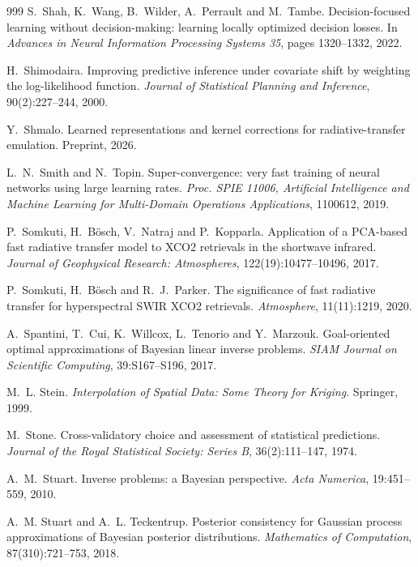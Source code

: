 \begin{thebibliography}{999}
S.~Shah, K.~Wang, B.~Wilder, A.~Perrault and M.~Tambe.
\newblock Decision-focused learning without decision-making: learning locally optimized decision losses.
\newblock In \emph{Advances in Neural Information Processing Systems 35}, pages 1320--1332, 2022.

H.~Shimodaira.
\newblock Improving predictive inference under covariate shift by weighting the log-likelihood function.
\newblock \emph{Journal of Statistical Planning and Inference}, 90(2):227--244, 2000.

Y.~Shmalo.
\newblock Learned representations and kernel corrections for radiative-transfer emulation.
\newblock Preprint, 2026.

L.~N.~Smith and N.~Topin.
\newblock Super-convergence: very fast training of neural networks using large learning rates.
\newblock \emph{Proc. SPIE 11006, Artificial Intelligence and Machine Learning for Multi-Domain Operations Applications}, 1100612, 2019.

P.~Somkuti, H.~B\"osch, V.~Natraj and P.~Kopparla.
\newblock Application of a PCA-based fast radiative transfer model to XCO2 retrievals in the shortwave infrared.
\newblock \emph{Journal of Geophysical Research: Atmospheres}, 122(19):10477--10496, 2017.

P.~Somkuti, H.~B\"osch and R.~J.~Parker.
\newblock The significance of fast radiative transfer for hyperspectral SWIR XCO2 retrievals.
\newblock \emph{Atmosphere}, 11(11):1219, 2020.

A.~Spantini, T.~Cui, K.~Willcox, L.~Tenorio and Y.~Marzouk.
\newblock Goal-oriented optimal approximations of Bayesian linear inverse problems.
\newblock \emph{SIAM Journal on Scientific Computing}, 39:S167--S196, 2017.

M.~L. Stein.
\newblock \emph{Interpolation of Spatial Data: Some Theory for Kriging}.
\newblock Springer, 1999.

M.~Stone.
\newblock Cross-validatory choice and assessment of statistical predictions.
\newblock \emph{Journal of the Royal Statistical Society: Series B}, 36(2):111--147, 1974.

A.~M.~Stuart.
\newblock Inverse problems: a Bayesian perspective.
\newblock \emph{Acta Numerica}, 19:451--559, 2010.

A.~M. Stuart and A.~L. Teckentrup.
\newblock Posterior consistency for Gaussian process approximations of Bayesian posterior distributions.
\newblock \emph{Mathematics of Computation}, 87(310):721--753, 2018.


\end{thebibliography}
